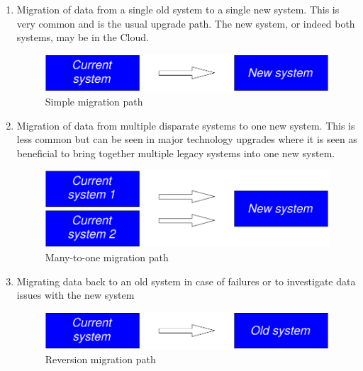 \begin{enumerate}
\item Migration of data from a single old system to a single new system.
This is very common and is the usual upgrade path.
The new system, or indeed both systems, may be in the Cloud.

\begin{figure}[htbp]
  \centering
  \includegraphics[width=\textwidth/2]{images/migration1.pdf}
  \caption{Simple migration path}
  \label{fig:migration1}
\end{figure}

\item Migration of data from multiple disparate systems to one new system.
This is less common but can be seen in major technology upgrades where it is seen as beneficial to bring together multiple
legacy systems into one new system.

\begin{figure}[htbp]
  \centering
  \includegraphics[width=\textwidth/2]{images/migration2.pdf}
  \caption{Many-to-one migration path}
  \label{fig:migration2}
\end{figure}

\item Migrating data back to an old system in case of failures or to investigate data issues with the new system

\begin{figure}[htbp]
  \centering
  \includegraphics[width=\textwidth/2]{images/migration3.pdf}
  \caption{Reversion migration path}
  \label{fig:migration3}
\end{figure}

\end{enumerate}
%
